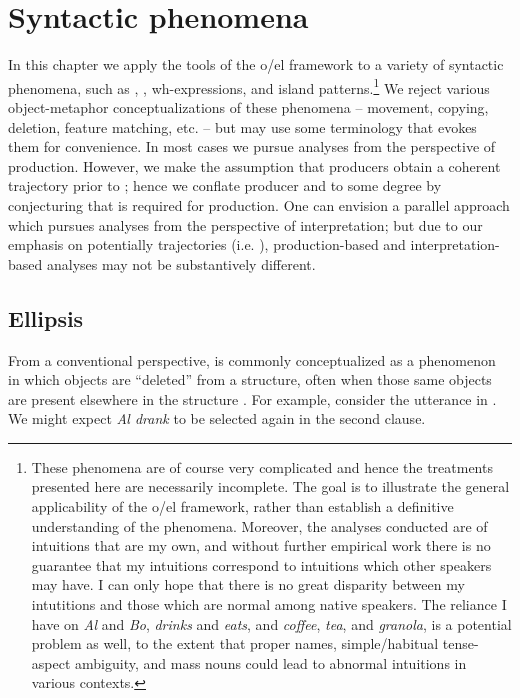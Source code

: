 \chapter{Syntactic phenomena}

In this chapter we apply the tools of the o/el framework to a variety of syntactic phenomena, such as , , wh-expressions, and island patterns.\footnote{These phenomena are of course very complicated and hence the treatments presented here are necessarily incomplete. The goal is to illustrate the general applicability of the o/el framework, rather than establish a definitive understanding of the phenomena. Moreover, the analyses conducted are of  intuitions that are my own, and without further empirical work there is no guarantee that my intuitions correspond to intuitions which other speakers may have. I can only hope that there is no great disparity between my intutitions and those which are normal among native speakers. The reliance I have on \textit{Al} and \textit{Bo}, \textit{drinks} and \textit{eats}, and \textit{coffee}, \textit{tea}, and \textit{granola}, is a potential problem as well, to the extent that proper names, simple/habitual tense-aspect ambiguity, and mass nouns could lead to abnormal  intuitions in various contexts.} We reject various object-metaphor conceptualizations of these phenomena -- movement, copying, deletion, feature matching, etc. -- but may use some terminology that evokes them for convenience. In most cases we pursue analyses from the perspective of production. However, we make the assumption that producers obtain a coherent trajectory prior to ; hence we conflate producer and  to some degree by conjecturing that  is required for production. One can envision a parallel approach which pursues analyses from the perspective of interpretation; but due to our emphasis on potentially  trajectories (i.e. ), production-based and interpretation-based analyses may not be substantively different. 

\section{Ellipsis}

From a conventional perspective,  is commonly conceptualized as a phenomenon in which objects are “deleted” from a structure, often when those same objects are present elsewhere in the structure \citep{Merchant2001,Merchant2005,Merchant2013}. For example, consider the utterance in . We might expect \textit{Al drank} to be selected again in the second clause.

